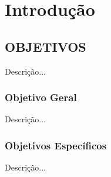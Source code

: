 \chapter{Introdução}

\section{OBJETIVOS}

Descrição...

\subsection{Objetivo Geral}

Descrição...

\subsection{Objetivos Específicos}

Descrição...

